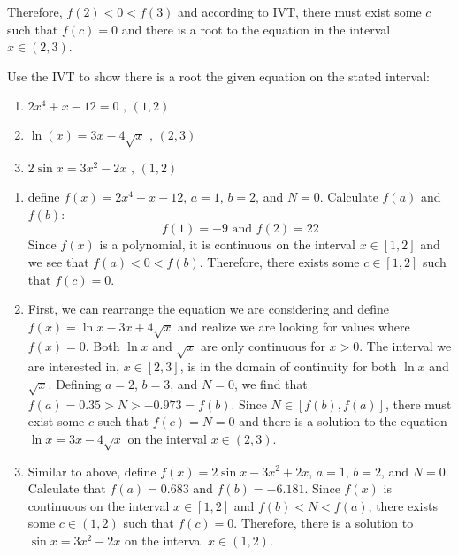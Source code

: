 Therefore, $f(2)<0<f(3)$ and according to IVT, there must exist some $c$ such that 
$f(c)=0$ and there is a root to the equation in the interval $x \in \left(2, 
3\right)$.

\begin{Exercise}
    [title=Intermediate Value Theorem Practice, label=IVTPrac]
    Use the IVT to show there is a root the given equation on the stated interval:\
    \begin{enumerate}
        \item $2x^4+x-12=0 \text{ , } \left(1, 2\right)$
        \item $\ln(x)=3x-4\sqrt{x}\text{ , } \left(2, 3\right)$
        \item $2\sin{x} = 3x^2-2x\text{ , } \left(1, 2\right)$
        \vspace{75mm}
    \end{enumerate}
\end{Exercise}
\begin{Answer}
    [ref=IVTPrac]
    \begin{enumerate}
        \item define $f(x)=2x^4+x-12$, $a=1$, $b=2$, and $N=0$. Calculate $f(a)$ and $f(b)$:
        $$f(1)=-9 \text{ and } f(2)=22$$ Since $f(x)$ is a polynomial, it is continuous on the interval $x\in\left[1, 2\right]$ and we see that $f(a) < 0 < f(b)$. Therefore, there exists some $c \in \left[1, 2\right]$ such that $f(c)=0$.\
        \item First, we can rearrange the equation we are considering and define $f(x)=\ln{x}-3x+4\sqrt{x}$ and realize we are looking for values where $f(x)=0$. Both $\ln{x}$ and $\sqrt{x}$ are only continuous for $x>0$. The interval we are interested in, $x \in \left[2, 3\right]$, is in the domain of continuity for both $\ln{x}$ and $\sqrt{x}$. Defining $a=2$, $b=3$, and $N=0$, we find that $f(a) = 0.35 > N > -0.973 = f(b)$. Since $N \in \left[f(b), f(a)\right]$, there must exist some $c$ such that $f(c)=N=0$ and there is a solution to the equation $\ln{x} = 3x-4\sqrt{x}$ on the interval $x \in \left(2, 3\right)$.
        \item Similar to above, define $f(x) = 2\sin{x}-3x^2+2x$, $a=1$, $b=2$, and $N=0$. Calculate that $f(a) = 0.683$ and $f(b) = -6.181$. Since $f(x)$ is continuous on the interval $ x \in \left[1, 2\right]$ and $f(b) < N < f(a)$, there exists some $c \in \left(1, 2 \right)$ such that $f(c) = 0$. Therefore, there is a solution to $\sin{x} = 3x^2-2x$ on the interval $ x\in \left(1, 2\right)$.
    \end{enumerate}
\end{Answer}

